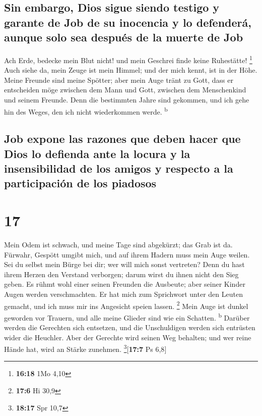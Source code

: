 \hypertarget{sin-embargo-dios-sigue-siendo-testigo-y-garante-de-job-de-su-inocencia-y-lo-defenderuxe1-aunque-solo-sea-despuuxe9s-de-la-muerte-de-job}{%
\subsection{Sin embargo, Dios sigue siendo testigo y garante de Job de
su inocencia y lo defenderá, aunque solo sea después de la muerte de
Job}\label{sin-embargo-dios-sigue-siendo-testigo-y-garante-de-job-de-su-inocencia-y-lo-defenderuxe1-aunque-solo-sea-despuuxe9s-de-la-muerte-de-job}}

 Ach Erde, bedecke mein Blut nicht! und mein Geschrei
finde keine Ruhestätte! \footnote{\textbf{16:18} 1Mo 4,10}
 Auch siehe da, mein Zeuge ist mein Himmel; und der mich
kennt, ist in der Höhe.  Meine Freunde sind meine
Spötter; aber mein Auge tränt zu Gott,  dass er
entscheiden möge zwischen dem Mann und Gott, zwischen dem Menschenkind
und seinem Freunde.  Denn die bestimmten Jahre sind
gekommen, und ich gehe hin des Weges, den ich nicht wiederkommen werde.
\textsuperscript{b}

\hypertarget{job-expone-las-razones-que-deben-hacer-que-dios-lo-defienda-ante-la-locura-y-la-insensibilidad-de-los-amigos-y-respecto-a-la-participaciuxf3n-de-los-piadosos}{%
\subsection{Job expone las razones que deben hacer que Dios lo defienda
ante la locura y la insensibilidad de los amigos y respecto a la
participación de los
piadosos}\label{job-expone-las-razones-que-deben-hacer-que-dios-lo-defienda-ante-la-locura-y-la-insensibilidad-de-los-amigos-y-respecto-a-la-participaciuxf3n-de-los-piadosos}}

\hypertarget{section-16}{%
\section{17}\label{section-16}}

 Mein Odem ist schwach, und meine Tage sind abgekürzt; das
Grab ist da.  Fürwahr, Gespött umgibt mich, und auf ihrem
Hadern muss mein Auge weilen.  Sei du selbst mein Bürge
bei dir; wer will mich sonst vertreten?  Denn du hast
ihrem Herzen den Verstand verborgen; darum wirst du ihnen nicht den Sieg
geben.  Es rühmt wohl einer seinen Freunden die Ausbeute;
aber seiner Kinder Augen werden verschmachten.  Er hat
mich zum Sprichwort unter den Leuten gemacht, und ich muss mir ins
Angesicht speien lassen. \footnote{\textbf{17:6} Hi 30,9} 
Mein Auge ist dunkel geworden vor Trauern, und alle meine Glieder sind
wie ein Schatten. \textsuperscript{b}  Darüber werden die
Gerechten sich entsetzen, und die Unschuldigen werden sich entrüsten
wider die Heuchler.  Aber der Gerechte wird seinen Weg
behalten; und wer reine Hände hat, wird an Stärke zunehmen.
\footnote{\textbf{18:17} Spr 10,7}{[}\textbf{17:7} Ps 6,8{]}

